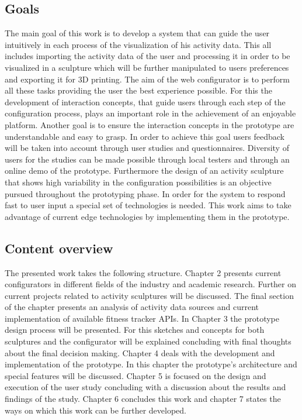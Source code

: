 \documentclass[../medieninformatik-arbeit.tex]{subfiles}
\begin{document}
\subsection{Goals}
The main goal of this work is to develop a system that can guide the user intuitively in each process of the visualization of his activity data. This all
includes importing the activity data of the user and processing it in order to be
visualized in a sculpture which will be further manipulated to users preferences
and exporting it for 3D printing. The aim of the web configurator is to perform all
these tasks providing the user the best experience possible. For this the development 
of interaction concepts, that guide users through each step of the configuration
process, plays an important role in the achievement of an enjoyable platform.
Another goal is to ensure the interaction concepts in the prototype are
understandable and easy to grasp. In order to achieve this goal users feedback
will be taken into account through user studies and questionnaires. Diversity of
users for the studies can be made possible through local testers and through
an online demo of the prototype. Furthermore the design of an activity sculpture that shows
high variability in the configuration possibilities is an objective pursued
throughout the prototyping phase. In order for the system to respond fast to
user input a special set of technologies is needed. This work aims to take advantage of
current edge technologies by implementing them in the prototype. 


\subsection{Content overview}
The presented work takes the following structure. Chapter 2 presents current
configurators in different fields of the industry and academic research. Further
on current projects related to activity sculptures will be discussed. The final
section of the chapter presents an analysis of activity data sources
and current implementation of available fitness tracker APIs. In Chapter 3 the
prototype design process will be presented. For this sketches and concepts for
both sculptures and the configurator will be explained concluding with final
thoughts about the final decision making. Chapter 4 deals with the development
and implementation of the prototype. In this chapter the prototype's architecture and
special features will be discussed. Chapter 5 is focused on the design and
execution of the user study concluding with a discussion about the results and
findings of the study. Chapter 6 concludes this work and chapter 7 states the
ways on which this work can be further developed.
\end{document}
